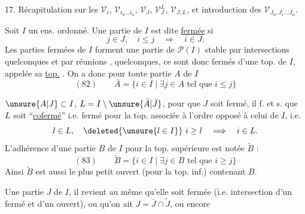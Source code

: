 
17. Récapitulation sur les $\mathcal V_i$, $\mathcal V_{i_0\ldots i_n}$, $\mathcal V_J$, $\mathcal V_J^L$, $\mathcal V_{J,L}$, et introduction des $\mathcal V_{J_0,J_1\ldots J_n}$.

Soit $I$ un ens. ordonné. Une partie  de $I$ est dite \uline{fermée} si
\[j\in J,\quad i\leq j\quad\Longrightarrow\quad i\in J.\]
Les parties fermées de $I$ forment une  partie de $\mathcal P(I)$ stable par intersections quelconques et par réunions , quelconques, ce sont donc   fermés d'une top. de $I$, appelée sa \uline{top.}  . On a donc pour toute partie $A$ de $I$
\[
(82)\qquad\bar A=\{i\in I\mid\exists j\in A\text{ tel que }i\leq j\}
\]

 $\unsure{A|J}\subset I$, $L=I\setminus\unsure{\bar A|\bar J}$, pour que $J$ soit fermé,  il f. et s. que $L$ soit ``\uline{cofermé}'' i.e. fermé pour la top. associée à l'ordre opposé à  celui de $I$, i.e.
\[l\in L,\quad\deleted{\unsure{l\in I}}\ i\geq l\quad\Longrightarrow\quad i\in L.\]
L'adhérence d'une partie $B$ de $I$ pour la top. supérieure est notée $\widetilde B$ :
\[
(83)\qquad\widetilde B=\{i\in I\mid\exists j\in B\text{ tel que }i\geq j\}
\]
 Ainsi $\widetilde B$ est aussi le plus petit ouvert (pour la top. inf.) contenant $B$.

 Une partie $J$ de $I$, il revient au même qu'elle soit  fermée (i.e. intersection d'un fermé et d'un ouvert), ou qu'on ait $J=\bar J\cap\widetilde J$, ou encore

